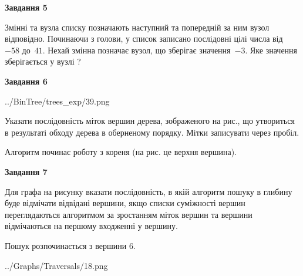 \documentclass[12pt, ukrainian]{article}
\begin{document}
{\begin {large}
{\begin {center}\textbf{Завдання 5}\end {center}}\par
Змінні  та  вузла списку позначають наступний та попередній за ним вузол відповідно. Починаючи з голови, у список записано послідовні цілі числа від~$-58$ до~$41$. Нехай змінна  позначає вузол, що зберігає значення~$-3$.
Яке значення зберігається у вузлі  ?\par
\newpage

{\begin {center}\textbf{Завдання 6}\end {center}}\par

\begin{center}
	{../BinTree/trees_exp/39.png}
\end{center}
Указати послідовність міток вершин дерева, зображеного на рис., що утвориться в результаті обходу дерева в оберненому порядку. Мітки записувати через пробіл.\par Алгоритм починає роботу з кореня (на рис. це верхня вершина).\par
\newpage

{\begin {center}\textbf{Завдання 7}\end {center}}\par
Для графа на рисунку вказати послідовність, в якій алгоритм пошуку в глибину буде відмічати відвідані вершини, якщо списки суміжності вершин переглядаються алгоритмом за зростанням міток вершин та вершини відмічаються на першому вход\-женні у вершину.\par
Пошук розпочинається з вершини 6.\par

\begin{center}
	{../Graphs/Traversals/18.png}
\end{center}\par
\newpage


\end{large}}
\end{document}
